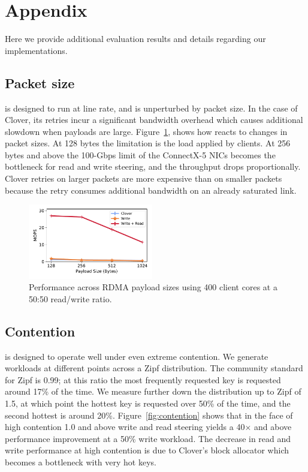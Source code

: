 \section{Appendix}

Here we provide additional evaluation results and details regarding
our implementations.

\subsection{Packet size}

{\sword} is designed to run at line rate, and is unperturbed by packet
size. In the case of Clover, its retries incur a significant bandwidth
overhead which causes additional slowdown when payloads are large.
Figure~\ref{fig:packet_size}, shows how {\sword} reacts to changes in
packet sizes. At 128 bytes the limitation is the load applied by
clients. At 256 bytes and above the 100-Gbps limit of the ConnectX-5
NICs becomes the bottleneck for read and write steering, and the
throughput drops proportionally.  Clover retries on larger packets are
more expensive than on smaller packets because the retry consumes
additional bandwidth on an already saturated link.

\begin{figure}
  \centering
  \includegraphics[width=0.485\textwidth]{fig/packet_size.pdf}

    \caption{Performance across RDMA payload sizes using 400 client cores at a
    50:50 read/write ratio.}

    \label{fig:packet_size}
\end{figure}

\subsection{Contention}

{\sword} is designed to operate well under even extreme contention. We
generate workloads at different points across a Zipf distribution.
The community standard for Zipf is 0.99; at this ratio the most
frequently requested key is requested around 17\% of the time. We
measure further down the distribution up to Zipf of 1.5, at which
point the hottest key is requested over 50\% of the time, and the
second hottest is around 20\%.  Figure~\ref{fig:contention} shows that
in the face of high contention 1.0 and above write and read steering
yields a 40$\times$ and above performance improvement at a 50\% write
workload. The decrease in read and write performance at high
contention is due to Clover's block allocator which becomes a
bottleneck with very hot keys.

